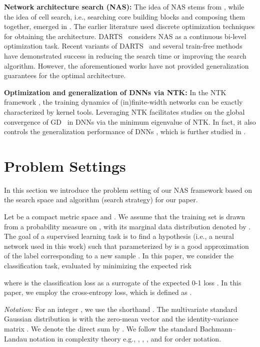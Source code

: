 \documentclass[nohyperref]{article}
\theoremstyle{plain}
\theoremstyle{definition}
\theoremstyle{remark}
\begin{document}
{\bf Network architecture search (NAS):} The idea of NAS stems from \citet{45826}, while the idea of cell search, i.e., searching core building blocks and composing them together, emerged in \citet{zoph2018learning}. The earlier literature used discrete optimization techniques for obtaining the architecture. DARTS~\citep{liu2019darts} considers NAS as a continuous bi-level optimization task. Recent variants of DARTS~\citep{xu2019pc, wu2019fbnet} and several train-free methods~\citep{mellor2021neural, chen2021neural, pmlr-v139-xu21m} have demonstrated success in reducing the search time or improving the search algorithm. However, the aforementioned works have not provided generalization guarantees for the optimal architecture. 


{\bf Optimization and generalization of DNNs via NTK:} In the NTK framework \citep{jacot2018neural,du2019gradient,chen2020much}, the training dynamics of (in)finite-width networks can be exactly characterized by kernel tools. Leveraging NTK facilitates studies on the global convergence of GD~\cite{pmlr-v97-allen-zhu19a, du2019gradient, nguyen2021proof} in DNNs via the minimum eigenvalue of NTK. In fact, it also controls the generalization performance of DNNs \citep{du2018gradient,cao2019generalization,allen2018learning}, which is further studied in \citet{bachspaper}. \section{Problem Settings}
\label{sec:preliminaries}
In this section we introduce the problem setting of our NAS framework based on the search space and algorithm (search strategy) for our paper.


Let  be a compact metric space and . We assume that the training set  is drawn from a probability measure  on , with its marginal data distribution denoted by .
The goal of a supervised learning task is to find a hypothesis (i.e., a neural network used in this work)  such that  parameterized by 
is a good approximation of the label  corresponding to a new sample .
In this paper, we consider the classification task, evaluated by minimizing the expected risk 



where  is the classification loss  as a surrogate of the expected 0-1 loss . In this paper, we employ the cross-entropy loss, which is
defined as .


\emph{Notation:}  For an integer , we use the shorthand . The multivariate standard Gaussian distribution is  with the zero-mean vector  and the identity-variance matrix . We denote the direct sum by . We follow the standard Bachmann–Landau notation in complexity theory e.g., , , , and  for order notation.
\end{document}

